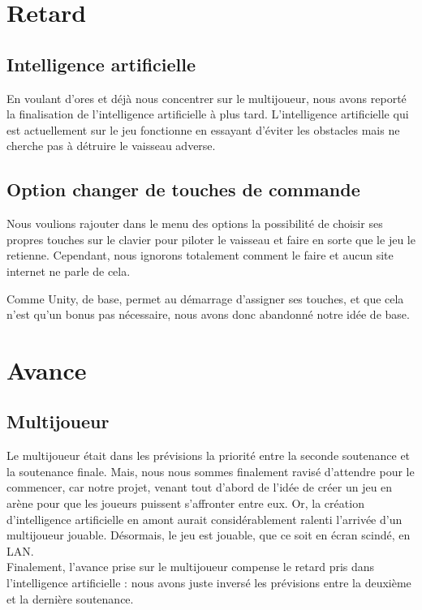 \documentclass[10pt, titlepage]{report}
\begin{document}
\section{Retard}

\subsection{Intelligence artificielle}
En voulant d'ores et déjà nous concentrer sur le multijoueur, nous avons reporté la finalisation de l'intelligence artificielle à plus tard. L'intelligence artificielle qui est actuellement sur le jeu fonctionne en essayant d'éviter les obstacles mais ne cherche pas à détruire le vaisseau adverse.\\

\subsection{Option changer de touches de commande}

Nous voulions rajouter dans le menu des options la possibilité de choisir ses propres touches sur le clavier pour piloter le vaisseau et faire en sorte que le jeu le retienne. Cependant, nous ignorons totalement comment le faire et aucun site internet ne parle de cela.

Comme Unity, de base, permet au démarrage d'assigner ses touches, et que cela n'est qu'un bonus pas nécessaire, nous avons donc abandonné notre idée de base.\\

\section{Avance}

\subsection{Multijoueur}
Le multijoueur était dans les prévisions la priorité entre la seconde soutenance et la soutenance finale. Mais, nous nous sommes finalement ravisé d'attendre pour le commencer, car notre projet, venant tout d'abord de l'idée de créer un jeu en arène pour que les joueurs puissent s'affronter entre eux. Or, la création d'intelligence artificielle en amont aurait considérablement ralenti l'arrivée d'un multijoueur jouable. Désormais, le jeu est jouable, que ce soit en écran scindé, en LAN.\\

Finalement, l'avance prise sur le multijoueur compense le retard pris dans l'intelligence artificielle : nous avons juste inversé les prévisions entre la deuxième et la dernière soutenance.
\end{document}

